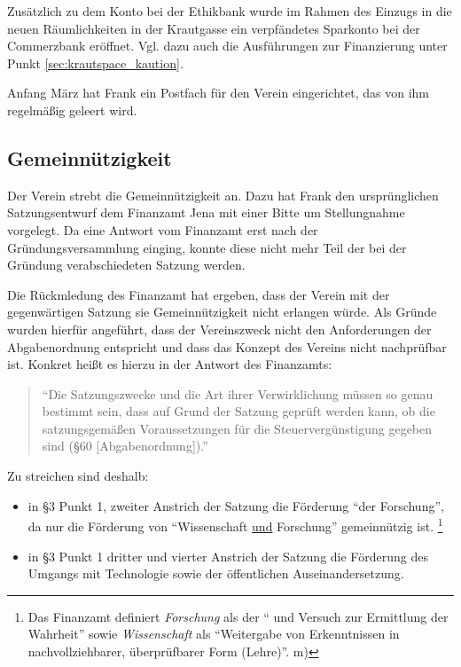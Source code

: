 \documentclass[10pt,DIV16]{scrartcl}
\begin{document}
Zusätzlich zu dem Konto bei der Ethikbank wurde im Rahmen des 
Einzugs in die neuen Räumlichkeiten in der Krautgasse ein 
verpfändetes Sparkonto bei der Commerzbank eröffnet. Vgl. dazu auch die Ausführungen zur Finanzierung unter Punkt \ref{sec:krautspace_kaution}.

Anfang März hat Frank ein Postfach für den Verein eingerichtet, das 
von ihm regelmäßig geleert wird. 

\subsection{Gemeinnützigkeit}

Der Verein strebt die Gemeinnützigkeit an.  Dazu hat Frank den 
ursprünglichen Satzungsentwurf dem Finanzamt Jena mit einer Bitte um 
Stellungnahme vorgelegt. Da eine Antwort vom Finanzamt erst nach der 
Gründungsversammlung einging, konnte diese nicht mehr Teil der bei 
der Gründung verabschiedeten Satzung werden. 

Die Rückmledung des Finanzamt hat ergeben, dass der Verein mit der 
gegenwärtigen Satzung sie Gemeinnützigkeit nicht erlangen würde. Als 
Gründe wurden hierfür angeführt, dass der Vereinszweck nicht den 
Anforderungen der Abgabenordnung entspricht und dass das Konzept des 
Vereins nicht nachprüfbar ist. Konkret heißt es hierzu in der 
Antwort des Finanzamts:

\begin{quote}
	"`Die Satzungszwecke und die Art ihrer Verwirklichung müssen so genau
	bestimmt sein, dass auf Grund der Satzung geprüft werden kann, ob die
	satzungsgemäßen Voraussetzungen für die Steuervergünstigung gegeben sind
	(§60 [Abgabenordnung])."'
\end{quote}

Zu streichen sind deshalb:

\begin{itemize}
	\item
		in §3 Punkt 1, zweiter Anstrich der Satzung die Förderung "`der
		Forschung"', da nur die Förderung von "`Wissenschaft \underline{und}
		Forschung"' gemeinnützig ist.
		\footnote{
			Das Finanzamt definiert \emph{Forschung} als der
			"`\underline{} und
			\underline{} Versuch zur Ermittlung der
			Wahrheit"' sowie \emph{Wissenschaft} als "`Weitergabe von
			Erkenntnissen in nachvollziehbarer, überprüfbarer Form (Lehre)"'.
			\quad m)
		}
	\item
		in §3 Punkt 1 dritter und vierter Anstrich der Satzung die Förderung
		des Umgangs mit Technologie sowie der öffentlichen Auseinandersetzung.
\end{itemize}
\end{document}
